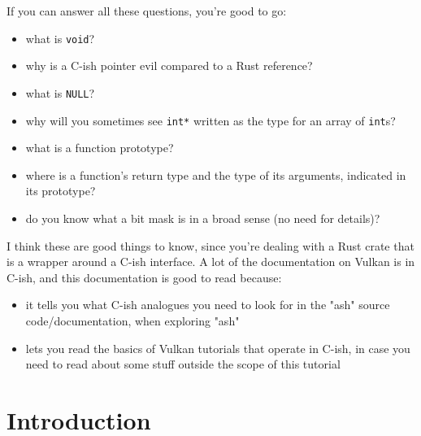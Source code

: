 \documentclass[12pt,letterpaper]{article}
\newcommand{\cil}[1]{\texttt{#1}}
\begin{document}
	If you can answer all these questions, you're good to go:
		\begin{itemize}
			\item what is \cil{void}? 
			\item why is a C-ish pointer evil compared to a Rust reference?
			\item what is \cil{NULL}?
			\item why will you sometimes see \cil{int*} written as the type for an array of \cil{int}s?
			\item what is a function prototype? 
			\item where is a function's return type and the type of its arguments, indicated in its prototype?
			\item do you know what a bit mask is in a broad sense (no need for details)? 
		\end{itemize}
	
	I think these are good things to know, since you're dealing with a Rust crate that is a wrapper around a C-ish interface. A lot of the documentation on Vulkan is in C-ish, and this documentation is good to read because:
		\begin{itemize}
			\item it tells you what C-ish analogues you need to look for in the "ash" source code/documentation, when exploring "ash"
			
			\item lets you read the basics of Vulkan tutorials that operate in C-ish, in case you need to read about some stuff outside the scope of this tutorial
		\end{itemize}
	
\section{Introduction}
\end{document}
